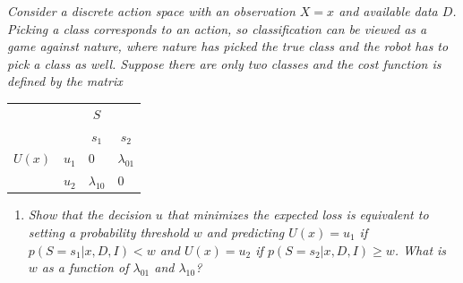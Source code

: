 \begin{example}
	\emph{Consider a discrete action space with an observation $X=x$ and available data $D$. Picking a class corresponds to an action, so classification can be viewed as a game against nature, where nature has picked the true class and the robot has to pick a class as well. Suppose there are only two classes and the cost function is defined by the matrix}
	\begin{center}
		\begin{tabular}{ c  c  c  c }
			&& $S$& \\
			&& $s_1$ & $s_2$  \\
			\cline{3-4}
			$U(x)$ & $u_1$& \multicolumn{1}{|l}{$0$} &\multicolumn{1}{l|}{$\lambda_{01}$}  \\
			& $u_2$& \multicolumn{1}{|l}{$\lambda_{10}$} & \multicolumn{1}{l|}{0} \\
			\cline{3-4}
		\end{tabular}
	\end{center}
	\begin{enumerate}
		\item \emph{Show that the decision $u$ that minimizes the expected loss is equivalent to setting a probability threshold $w$ and predicting $U(x)=u_1$ if $p(S=s_1|x,D,I) < w$ and $U(x)=u_2$ if $p(S=s_2|x,D,I)\geq w$. What is $w$ as a function of $\lambda_{01}$ and $\lambda_{10}$?}\newline
		

\end{enumerate}
\end{example}
